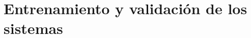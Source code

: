 \chapter{Entrenamiento y validación de los sistemas}
\label{chap:entrenamiento_y_validacion}

\nocite{aggarwal_recommender_2016}


